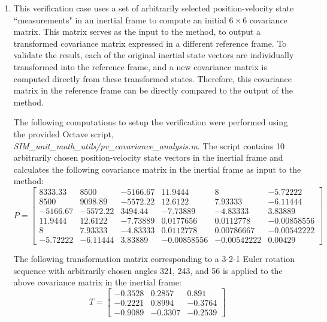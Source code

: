 \documentclass[11pt,fleqn]{report}
\begin{document}
\begin{enumerate}
{\begin{equation*}
\begin{bmatrix}
 2& -12 &23 &25 & -24 &26 \\
 -12& 1 & -13 & -15 &14 & -16 \\
23& -13 & 3 &35 & -34 &36 \\
25& -15 &35 & 5 & -45 &56 \\
 -24&14 & -34 & -45 & 4 & -46 \\
26& -16 &36 &56 & -46 & 6
\end{bmatrix}
\end{equation*}}
\item{
This verification case uses a set of arbitrarily selected position-velocity state 
``measurements" in an inertial frame to compute an initial $6 \times 6$ covariance 
matrix. This matrix serves as the input to the method, to output a transformed 
covariance matrix expressed in a different reference frame. To 
validate the result, each of the original inertial state vectors are individually
transformed into the reference frame, and a new covariance matrix is computed 
directly from these transformed states. Therefore, this covariance matrix in 
the reference frame can be directly compared to the output of the method.

The following computations to setup the verification were performed 
using the provided Octave script, 
\textit{SIM\_unit\_math\_utils/pv\_covariance\_analysis.m}. The script contains 10 
arbitrarily chosen position-velocity state vectors in the inertial frame and 
calculates the following covariance matrix in the inertial frame as input to the method:
\begin{equation*}
P = 
\begin{bmatrix}
8333.33	 & 8500	& -5166.67 &	11.9444	 & 8	& -5.72222 \\
8500	 & 9098.89	& -5572.22 &	12.6122	 & 7.93333	& -6.11444 \\
-5166.67 & -5572.22	& 3494.44	 & -7.73889	 & -4.83333	& 3.83889 \\
11.9444	 & 12.6122	& -7.73889 &	0.0177656	 & 0.0112778	& -0.00858556 \\
8	 & 7.93333	& -4.83333 &	0.0112778	 & 0.00786667	& -0.00542222 \\
-5.72222 & -6.11444	& 3.83889	 & -0.00858556 &	-0.00542222	&0.00429
\end{bmatrix}
\end{equation*}

The following transformation matrix corresponding to a 3-2-1 Euler rotation sequence with 
arbitrarily chosen angles 321\textdegree, 243\textdegree, and 56\textdegree\text{ }
is applied to the above covariance matrix in the inertial frame:
\begin{equation*}
T = 
\begin{bmatrix}
-0.3528	& 0.2857	& 0.891 \\
-0.2221	& 0.8994	& -0.3764 \\
-0.9089	& -0.3307	& -0.2539
\end{bmatrix}
\end{equation*}

}
\end{enumerate}
\end{document}
